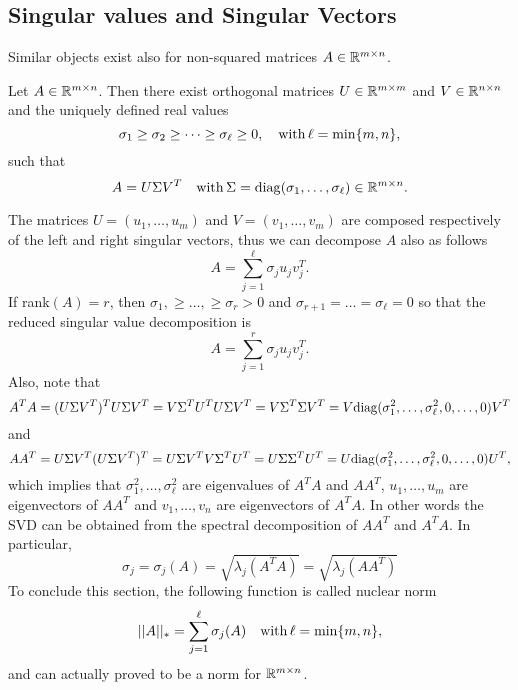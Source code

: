 \documentclass[10pt,a4paper]{article}
\begin{document}
\subsection{Singular values and Singular Vectors}
Similar objects exist also for non-squared matrices $A \in \mathbb{R}^{m\times n}$.
\begin{theorem} Let $A \in \mathbb{R}^{m\times n}$. Then there exist orthogonal matrices $U\in \mathbb{R}^{m\times m}$ and $V\in \mathbb{R}^{n\times n}$ and the uniquely defined real values
\begin{equation*}
	\sigma_1\geq \sigma_2 \geq \dots \geq \sigma_\ell \geq 0, \quad \mathord{\mathrm{with }}\, \ell=\min\{m,n\},
\end{equation*}
such that 
\begin{equation*}
	A = U \Sigma V^T \quad \mathord{\mathrm{with }}\, \Sigma=\mathord{\mathrm{diag}}(\sigma_1, \dots, \sigma_\ell) \in \mathbb{R}^{m\times n}.
\end{equation*}
\end{theorem}
The matrices $U = (u_1, \dots, u_m)$ and $V = (v_1, \dots, v_m)$ are composed respectively of the left and right singular vectors, thus we can decompose $A$ also as follows
\begin{equation*}
	A = \sum_{j=1}^{\ell} \sigma_j u_jv_j^T.
\end{equation*}
If rank$(A)=r$, then $\sigma_1, \geq \dots, \geq \sigma_r>0$ and $\sigma_{r+1}= \dots=\sigma_\ell=0$ so that the reduced singular value decomposition is
\begin{equation*}
	A = \sum_{j=1}^{r} \sigma_j u_jv_j^T.
\end{equation*}
Also, note that 
\begin{equation*}
	A^T A=(U\Sigma V^T)^T U \Sigma V^T = V \Sigma^T U^T U \Sigma V^T = V \Sigma^T \Sigma V^T = V\mathord{\mathrm{diag}}(\sigma_1^2, \dots, \sigma_\ell^2, 0, \dots, 0) V^T
\end{equation*}
and 
\begin{equation*}
	A A^T=U\Sigma V^T (U \Sigma V^T)^T = U \Sigma V^T V \Sigma^T U^T = U \Sigma \Sigma^T U^T = U\mathord{\mathrm{diag}}(\sigma_1^2, \dots, \sigma_\ell^2, 0, \dots, 0) U^T,
\end{equation*}
which implies that $\sigma_1^2, \dots, \sigma_\ell^2$ are eigenvalues of $A^T A$ and $AA^T$, 
$u_1, \dots, u_m$ are eigenvectors of $AA^T$ and $v_1, \dots, v_n$ are eigenvectors of $A^TA$. In other words the SVD can be obtained from the spectral decomposition of $AA^T$ and $A^TA$. In particular, 
\begin{equation*}
	\sigma_j = \sigma_j(A) = \sqrt{\lambda_j(A^TA)} = \sqrt{\lambda_j(AA^T)}
\end{equation*}
To conclude this section, the following function is called nuclear norm
\begin{equation*}
	||A||_* = \sum_{j=1}^{\ell} \sigma_j(A) \quad \mathord{\mathrm{with }}\, \ell =\min\{m,n\},
\end{equation*}
and can actually proved to be a norm for $\mathbb{R}^{m\times n}$.
\end{document}
